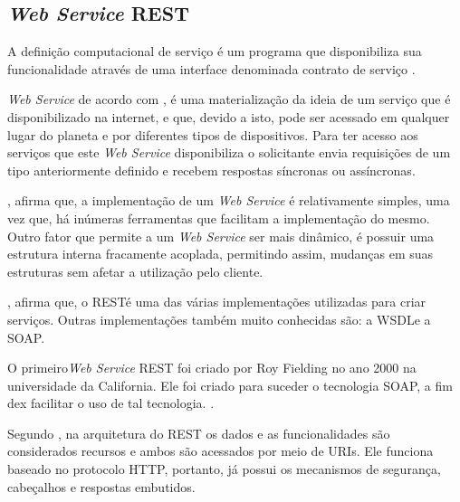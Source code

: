 \subsection{\textit{Web Service} REST}

A definição computacional de serviço é um programa que disponibiliza sua funcionalidade através de uma interface denominada contrato de serviço \cite{erl_soa_with_rest}.

\textit{Web Service} de acordo com , é uma materialização da ideia de um serviço que é disponibilizado na internet, e que, devido a isto, pode ser acessado em qualquer lugar do planeta e por diferentes tipos de dispositivos. Para ter acesso aos serviços que este \textit{Web Service} disponibiliza o solicitante envia requisições de um tipo anteriormente definido e recebem respostas síncronas ou assíncronas.

, afirma que, a implementação de um \textit{Web Service} é relativamente simples, uma vez que, há inúmeras ferramentas que facilitam a implementação do mesmo. Outro fator que permite a um \textit{Web Service} ser mais dinâmico, é possuir uma estrutura interna fracamente acoplada, permitindo assim, mudanças em suas estruturas sem afetar a utilização pelo cliente.

, afirma que, o REST\footnotemark[17] é uma das várias implementações utilizadas para criar serviços. Outras implementações também muito conhecidas são: a WSDL\footnotemark[18] e a SOAP\footnotemark[19].




O primeiro\textit{Web Service} REST foi criado por Roy Fielding no ano 2000 na universidade da California. Ele foi criado para suceder o tecnologia SOAP, a fim dex facilitar o uso de tal tecnologia. \cite{ibm_web_service}.

Segundo , na arquitetura do REST os dados e as funcionalidades são considerados recursos e ambos são acessados por meio de  URIs\footnotemark[20]. Ele funciona baseado no protocolo HTTP, portanto, já possui os mecanismos de segurança, cabeçalhos e respostas embutidos.

